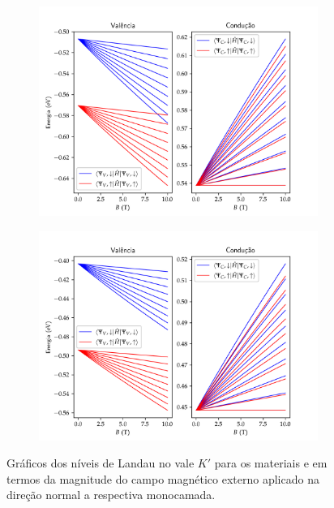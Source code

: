 \begin{figure}[p]
  \centering
  \begin{subfigure}{\textwidth}
    \includegraphics[trim=0 0.28cm 0 0.9cm,clip,width=\textwidth]{imagens/crs2_k_prime_valley_landau_levels.png}
    \caption{}
    \label{fig:crs2_k_prime_valley_landau_levels}
  \end{subfigure}
  \begin{subfigure}{\textwidth}
    \includegraphics[trim=0 0.28cm 0 0.9cm,clip,width=\textwidth]{imagens/crse2_k_prime_valley_landau_levels.png}
    \caption{}
    \label{fig:crse2_k_prime_valley_landau_levels}
  \end{subfigure}
  \caption{
    Gráficos dos níveis de Landau no vale $K'$ para os materiais
      e
      em termos da
    magnitude do campo magnético externo aplicado na direção normal a respectiva
    monocamada.
  }
  \label{fig:k_prime_valley_landau_levels}
\end{figure}

